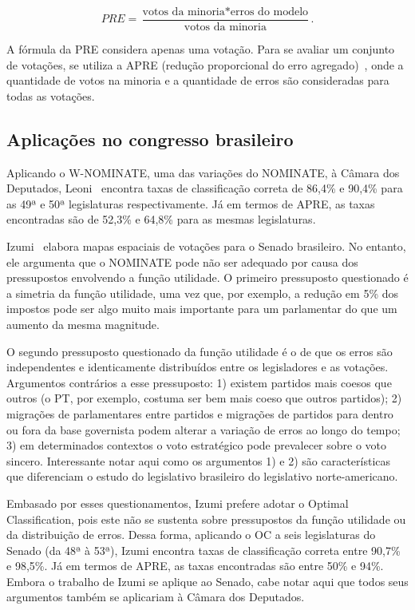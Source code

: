 \documentclass[a4paper, 12pt]{article}
\newcommand\nominate{NOMINATE\xspace}
\newcommand\wnominate{W-NOMINATE\xspace}
\begin{document}
\[PRE = \frac{\textrm{votos da minoria} * \textrm{erros do modelo}}{\textrm{votos da minoria}}.\]

A fórmula da PRE considera apenas uma votação. Para se avaliar um conjunto de votações, se utiliza a APRE (redução proporcional do erro agregado)~\cite{leoni02cdep}, onde a quantidade de votos na minoria e a quantidade de erros são consideradas para todas as votações.

\subsection*{Aplicações no congresso brasileiro}

Aplicando o \wnominate, uma das variações do \nominate, à Câmara dos Deputados, Leoni~\cite{leoni02cdep} encontra taxas de classificação correta de 86,4\% e 90,4\% para as 49ª e 50ª legislaturas respectivamente. Já em termos de APRE, as taxas encontradas são de 52,3\% e 64,8\% para as mesmas legislaturas.

Izumi~\cite{izumi2016senado} elabora mapas espaciais de votações para o Senado brasileiro. No entanto, ele argumenta que o \nominate pode não ser adequado por causa dos pressupostos envolvendo a função utilidade. O primeiro pressuposto questionado é a simetria da função utilidade, uma vez que, por exemplo, a redução em 5\% dos impostos pode ser algo muito mais importante para um parlamentar do que um aumento da mesma magnitude.

O segundo pressuposto questionado da função utilidade é o de que os erros são independentes e identicamente distribuídos entre os legisladores e as votações. Argumentos contrários a esse pressuposto: 1) existem partidos mais coesos que outros (o PT, por exemplo, costuma ser bem mais coeso que outros partidos); 2) migrações de parlamentares entre partidos e migrações de partidos para dentro ou fora da base governista podem alterar a variação de erros ao longo do tempo;  3) em determinados contextos o voto estratégico pode prevalecer sobre o voto sincero. Interessante notar aqui como os argumentos 1) e 2) são características que diferenciam o estudo do legislativo brasileiro do legislativo norte-americano.

Embasado por esses questionamentos, Izumi prefere adotar o Optimal Classification, pois este não se sustenta sobre pressupostos da função utilidade ou da distribuição de erros. Dessa forma, aplicando o OC a seis legislaturas do Senado (da 48ª à 53ª), Izumi encontra taxas de classificação correta entre 90,7\% e 98,5\%. Já em termos de APRE, as taxas encontradas são entre 50\% e 94\%. Embora o trabalho de Izumi se aplique ao Senado, cabe notar aqui que todos seus argumentos também se aplicariam à Câmara dos Deputados.
\end{document}
